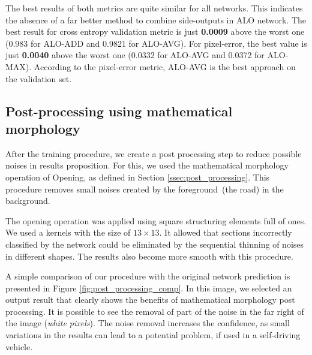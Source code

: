 The best results of both metrics are quite similar for all networks. This indicates the absence of a far better method to combine side-outputs in ALO network. The best result for cross entropy validation metric is just \textbf{0.0009} above the worst one (0.983 for ALO-ADD and 0.9821 for ALO-AVG). For pixel-error, the best value is just \textbf{0.0040} above the worst one (0.0332 for ALO-AVG and 0.0372 for ALO-MAX). According to the pixel-error metric, ALO-AVG is the best approach on the validation set.


\subsection{Post-processing using mathematical morphology}

After the training procedure, we create a post processing step to reduce possible noises in results proposition. For this, we used the mathematical morphology operation of Opening, as defined in Section \ref{ssec:post_processing}. This procedure removes small noises created by the foreground~(the road) in the background. 

The opening operation was applied using square structuring elements full of ones. We used a kernels with the size of $13\times13$. It allowed that sections incorrectly classified by the network could be eliminated by the sequential thinning of noises in different shapes. The results also become more smooth with this procedure.


A simple comparison of our procedure with the original network prediction is presented in Figure \ref{fig:post_processing_comp}. In this image, we selected an output result that clearly shows the benefits of mathematical morphology post processing. It is possible to see the removal of part of the noise in the far right of the image (\textit{white pixels}). The noise removal increases the confidence, as small variations in the results can lead to a potential problem, if used in a self-driving vehicle. 


